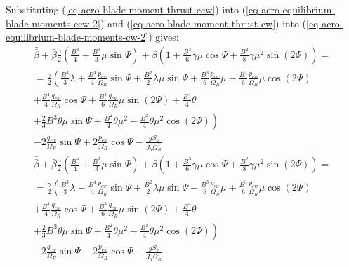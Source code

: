 Substituting (\ref{eq-aero-blade-moment-thrust-ccw}) into (\ref{eq-aero-equilibrium-blade-moments-ccw-2}) and (\ref{eq-aero-blade-moment-thrust-cw}) into (\ref{eq-aero-equilibrium-blade-moments-cw-2}) gives:
\begin{multline}
  \label{eq-aero-flapping-coefs-ccw-1}
  \bar{\bar \beta} + \bar \beta \frac{\gamma}{2}
  \left( \frac{B^4}{4} + \frac{B^3}{3} \mu \sin \Psi \right)
  + \beta \left(
    1 + \frac{B^3}{6} \gamma \mu \cos \Psi
    + \frac{B^2}{8} \gamma \mu^2 \sin \left( 2 \Psi \right)
  \right)
  = \\ =
  \frac{\gamma}{2}
  \left(
      \frac{B^3}{3} \lambda
    + \frac{B^4}{4} \frac{p_{cw}}{\Omega_R} \sin \Psi
    + \frac{B^2}{2} \lambda \mu \sin \Psi
    + \frac{B^3}{6} \frac{p_{cw}}{\Omega_R} \mu
    - \frac{B^3}{6} \frac{p_{cw}}{\Omega_R} \mu \cos \left( 2 \Psi \right)
    \right.
    \\
    + \frac{B^4}{4} \frac{q_{cw}}{\Omega_R} \cos \Psi
    + \frac{B^3}{6} \frac{q_{cw}}{\Omega_R} \mu \sin \left( 2 \Psi \right)
    + \frac{B^4}{4} \theta
    \\
    \left.
    + \frac{2}{3} B^3 \theta \mu \sin \Psi
    + \frac{B^2}{4} \theta \mu^2
    - \frac{B^2}{4} \theta \mu^2 \cos \left( 2 \Psi \right)
  \right)
  \\
  - 2 \frac{q_{cw}}{\Omega_R} \sin \Psi
  + 2 \frac{p_{cw}}{\Omega_R} \cos \Psi
  - \frac{ g S_b }{ J_b \Omega_R^2 }
\end{multline}
\begin{multline}
  \label{eq-aero-flapping-coefs-cw-1}
  \bar{\bar \beta} + \bar \beta \frac{\gamma}{2}
  \left( \frac{B^4}{4} + \frac{B^3}{3} \mu \sin \Psi \right)
  + \beta \left(
    1 + \frac{B^3}{6} \gamma \mu \cos \Psi
    + \frac{B^2}{8} \gamma \mu^2 \sin \left( 2 \Psi \right)
  \right)
  = \\ =
  \frac{\gamma}{2}
  \left(
      \frac{B^3}{3} \lambda
    - \frac{B^4}{4} \frac{p_{cw}}{\Omega_R} \sin \Psi
    + \frac{B^2}{2} \lambda \mu \sin \Psi
    - \frac{B^3}{6} \frac{p_{cw}}{\Omega_R} \mu
    + \frac{B^3}{6} \frac{p_{cw}}{\Omega_R} \mu \cos \left( 2 \Psi \right)
    \right.
    \\
    + \frac{B^4}{4} \frac{q_{cw}}{\Omega_R} \cos \Psi
    + \frac{B^3}{6} \frac{q_{cw}}{\Omega_R} \mu \sin \left( 2 \Psi \right)
    + \frac{B^4}{4} \theta
    \\
    \left.
    + \frac{2}{3} B^3 \theta \mu \sin \Psi
    + \frac{B^2}{4} \theta \mu^2
    - \frac{B^2}{4} \theta \mu^2 \cos \left( 2 \Psi \right)
  \right)
  \\
  - 2 \frac{q_{cw}}{\Omega_R} \sin \Psi
  - 2 \frac{p_{cw}}{\Omega_R} \cos \Psi
  - \frac{ g S_b }{ J_b \Omega_R^2 }
\end{multline}

